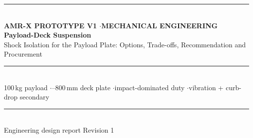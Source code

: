 \documentclass[11pt,a4paper]{article}
\begin{document}
\begin{titlepage}
\thispagestyle{empty}
\vspace*{2.2cm}
\noindent\rule{\linewidth}{1.2pt}\\[10pt]
{\small\bfseries\color{black} AMR-X PROTOTYPE V1 \quad$\cdot$\quad MECHANICAL ENGINEERING}\\[14pt]
{\color{black}\Huge\bfseries Payload-Deck Suspension}\\[8pt]
{\color{black}\Large Shock Isolation for the Payload Plate: Options, Trade-offs, Recommendation and Procurement}\\[12pt]
\noindent\rule{\linewidth}{0.5pt}\\[10pt]
{\normalsize 100\,kg payload \quad$\cdot$--800\,mm deck plate \quad$\cdot$\quad impact-dominated duty \quad$\cdot$\quad vibration + curb-drop secondary}
\vfill
\noindent\rule{\linewidth}{0.5pt}\\[4pt]
{\footnotesize Engineering design report \hfill Revision 1}
\end{titlepage}

\end{document}
